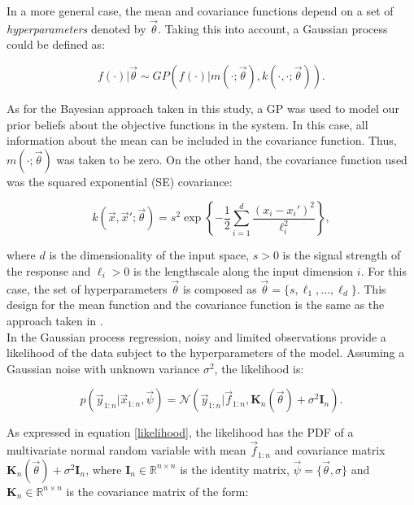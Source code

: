 \documentclass{article}
\begin{document}
In a more general case, the mean and covariance functions depend on a set of \textit{hyperparameters} denoted by $\vec{\theta}$. Taking this into account, a Gaussian process could be defined as:

\begin{equation}
    f(\cdot)|\vec{\theta} \sim GP(f(\cdot)|m(\cdot;\vec{\theta}),k(\cdot,\cdot;\vec{\theta})).
\end{equation}

As for the Bayesian approach taken in this study, a GP was used to model our prior beliefs about the objective functions in the system. In this case, all information about the mean can be included in the covariance function. Thus, $m(\cdot;\vec{\theta})$ was taken to be zero. On the other hand, the covariance function used was the squared exponential (SE) covariance:

\begin{equation}
    k(\vec{x},\vec{x}';\vec{\theta}) = s^2 \exp \left \{ -\frac{1}{2}\sum_{i=1}^{d}\frac{(x_i - x_i')^2}{\ell_i^2} \right \},
\end{equation}

where $d$ is the dimensionality of the input space, $s > 0$ is the signal strength of the response and $\ell_i > 0$ is the lengthscale along the input dimension $i$. For this case, the set of hyperparameters $\vec{\theta}$ is composed as $\vec{\theta} = \{s, \ell_1, \ldots, \ell_d\}$. This design for the mean function and the covariance function is the same as the approach taken in \cite{Pandita2016}.\\

In the Gaussian process regression, noisy and limited observations provide a likelihood of the data subject to the hyperparameters of the model. Assuming a Gaussian noise with unknown variance $\sigma^2$, the likelihood is\cite{Pandita2016}:

\begin{equation}
    p(\vec{y}_{1:n}|\vec{x}_{1:n}, \vec{\psi}) = \mathcal{N}(\vec{y}_{1:n}|\vec{f}_{1:n},\textbf{K}_n(\vec{\theta}) + \sigma^2\textbf{I}_n).
    \label{likelihood}
\end{equation}

As expressed in equation \ref{likelihood}, the likelihood has the PDF of a multivariate normal random variable with mean $\vec{f}_{1:n}$ and covariance matrix $\textbf{K}_n(\vec{\theta}) + \sigma^2\textbf{I}_n$, where $\textbf{I}_n \in \mathbb{R}^{n\times n}$ is the identity matrix, $\vec{\psi} = \{ \vec{\theta}, \sigma \} $ and $\textbf{K}_n \in \mathbb{R}^{n\times n}$ is the covariance matrix of the form:
\end{document}
